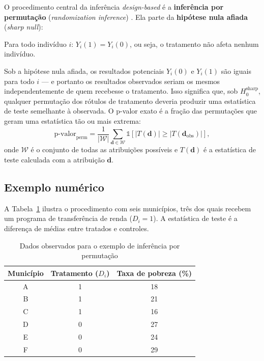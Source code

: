 O procedimento central da inferência \textit{design-based} é a \textbf{inferência por permutação} (\textit{randomization inference}) \citep{Fisher1935}. Ela parte da \textbf{hipótese nula afiada} (\textit{sharp null}):

\begin{hipotesebox}
Para todo indivíduo $i$: $Y_i(1) = Y_i(0)$, ou seja, o tratamento não afeta nenhum indivíduo.
\end{hipotesebox}

Sob a hipótese nula afiada, os resultados potenciais $Y_i(0)$ e $Y_i(1)$ são iguais para todo $i$ — e portanto os resultados observados seriam os mesmos independentemente de quem recebesse o tratamento. Isso significa que, sob $H_0^{\text{sharp}}$, qualquer permutação dos rótulos de tratamento deveria produzir uma estatística de teste semelhante à observada. O p-valor exato é a fração das permutações que geram uma estatística tão ou mais extrema:
\begin{equation}
  \text{p-valor}_{\text{perm}} = \frac{1}{|\mathcal{W}|}
    \sum_{\mathbf{d} \in \mathcal{W}}
    \mathds{1}\!\left[|T(\mathbf{d})| \geq |T(\mathbf{d}_{\text{obs}})|\right],
  \label{eq:pvalue_perm}
\end{equation}
onde $\mathcal{W}$ é o conjunto de todas as atribuições possíveis e $T(\mathbf{d})$ é a estatística de teste calculada com a atribuição $\mathbf{d}$.

\subsection*{Exemplo numérico}

A Tabela~\ref{tab:permutacao} ilustra o procedimento com seis municípios, três dos quais recebem um programa de transferência de renda ($D_i = 1$). A estatística de teste é a diferença de médias entre tratados e controles.

\begin{table}[H]
\centering
\caption{Dados observados para o exemplo de inferência por permutação}
\label{tab:permutacao}
\begin{tabular}{ccc}
\toprule
Município & Tratamento ($D_i$) & Taxa de pobreza (\%) \\
\midrule
A & 1 & 18 \\
B & 1 & 21 \\
C & 1 & 16 \\
D & 0 & 27 \\
E & 0 & 24 \\
F & 0 & 29 \\
\bottomrule
\end{tabular}

\vspace{4pt}
\end{table}

